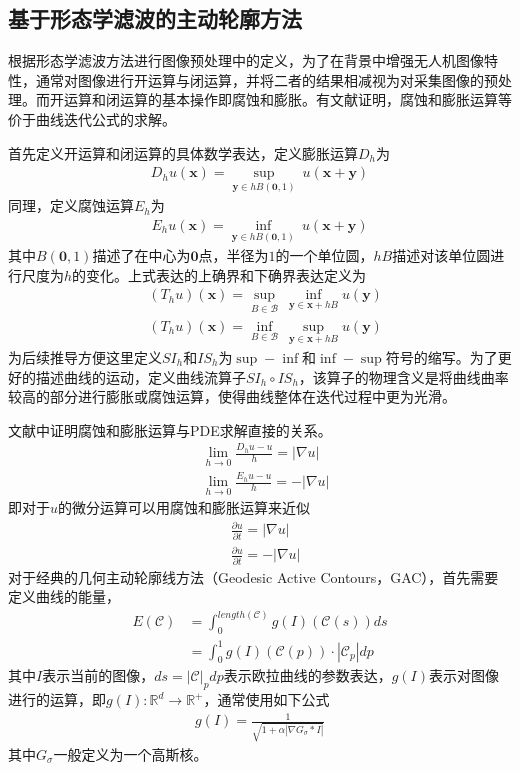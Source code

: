 \subsection{基于形态学滤波的主动轮廓方法}
根据形态学滤波方法进行图像预处理中的定义，为了在背景中增强无人机图像特性，通常对图像进行开运算与闭运算，并将二者的结果相减视为对采集图像的预处理。而开运算和闭运算的基本操作即腐蚀和膨胀。有文献证明，腐蚀和膨胀运算等价于曲线迭代公式的求解。

首先定义开运算和闭运算的具体数学表达，定义膨胀运算$D_h$为
\begin{align}
D_hu(\mathbf{x}) = \sup_{\mathbf{y}\in hB(\mathbf{0},1)}\ u(\mathbf{x}+\mathbf{y})
\end{align}
同理，定义腐蚀运算$E_h$为
\begin{align}
E_hu(\mathbf{x}) = \inf_{\mathbf{y}\in hB(\mathbf{0},1)}\ u(\mathbf{x}+\mathbf{y})
\end{align}
其中$B(\mathbf{0},1)$描述了在中心为$\mathbf{0}$点，半径为$1$的一个单位圆，$hB$描述对该单位圆进行尺度为$h$的变化。上式表达的上确界和下确界表达定义为
\begin{align}
&(T_hu)(\mathbf{x}) = \sup_{B\in\mathcal{B}}\  \inf_{\mathbf{y}\in\mathbf{x}+hB} u(\mathbf{y}) \\
&(T_hu)(\mathbf{x}) = \inf_{B\in\mathcal{B}}\  \sup_{\mathbf{y}\in\mathbf{x}+hB} u(\mathbf{y})
\end{align}
为后续推导方便这里定义$SI_h$和$IS_h$为$\sup-\inf$和$\inf-\sup$符号的缩写。为了更好的描述曲线的运动，定义曲线流算子$SI_h \circ IS_h$，该算子的物理含义是将曲线曲率较高的部分进行膨胀或腐蚀运算，使得曲线整体在迭代过程中更为光滑。

文献\cite{alvarez1993axioms}中证明腐蚀和膨胀运算与PDE求解直接的关系。
\begin{align}
&\lim_{h \rightarrow 0} \frac{D_hu-u}{h} = |\nabla u| \\
&\lim_{h \rightarrow 0} \frac{E_hu-u}{h} = -|\nabla u|
\end{align}
即对于$u$的微分运算可以用腐蚀和膨胀运算来近似
\begin{align}
&\frac{\partial u}{\partial t} = |\nabla u| \\
&\frac{\partial u}{\partial t} = -|\nabla u|
\end{align}
对于经典的几何主动轮廓线方法（Geodesic Active Contours，GAC），首先需要定义曲线的能量，
\begin{align}
E(\mathcal{C}) &=\int_0^{length (\mathcal{C})}g(I)(\mathcal{C}(s))ds \\
&=\int_0^1g(I)(\mathcal{C}(p)) \cdot |\mathcal{C}_p|dp
\end{align}
其中$I$表示当前的图像，$ds = |\mathcal{C}|_pdp$表示欧拉曲线的参数表达，$g(I)$表示对图像进行的运算，即$g(I) : \mathbb{R}^d \rightarrow \mathbb{R}^+$，通常使用如下公式
\begin{align}
g(I) = \frac{1}{\sqrt{1+\alpha|\nabla G_\sigma *I|}}
\end{align}
其中$G_\sigma$一般定义为一个高斯核。

